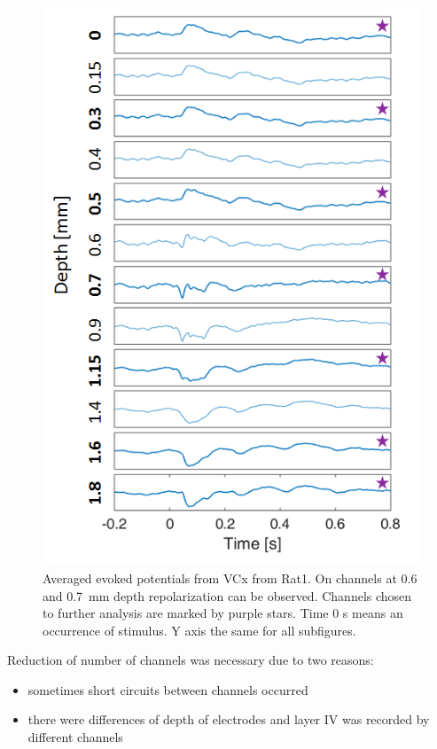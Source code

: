 \documentclass{pracalicmgr}
\begin{document}
    \begin{figure}[H]
    	\begin{center}
    		\includegraphics[scale=0.75]{wybieranie_kanalow3.png}
    	\end{center}
    	\caption{ Averaged evoked potentials from VCx from Rat1. On channels at 0.6 and 0.7~mm depth repolarization can be observed. Channels chosen to further analysis are marked by purple stars. Time 0 s means an occurrence of stimulus. Y axis the same for all subfigures.}
    	\label{rys:kanaly}
    \end{figure} 
    
    Reduction of number of channels was necessary due to two reasons:
    \begin{itemize}
    	\item sometimes short circuits between channels occurred
    	\item there were differences of depth of electrodes and layer IV was recorded by different channels
    \end{itemize} 
\end{document}
